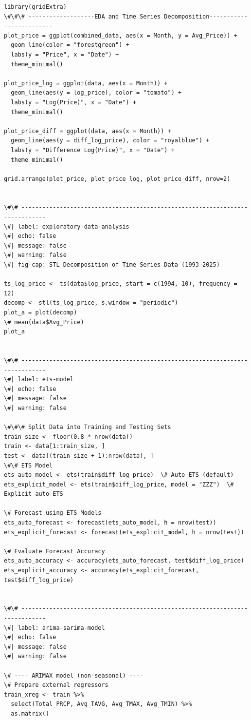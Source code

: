 \documentclass[
  letterpaper,
  DIV=11,
  numbers=noendperiod]{scrartcl}
\begin{document}
\begin{verbatim}
library(gridExtra)
\#\#\# -------------------EDA and Time Series Decomposition-------------------------
plot_price = ggplot(combined_data, aes(x = Month, y = Avg_Price)) +
  geom_line(color = "forestgreen") +
  labs(y = "Price", x = "Date") +
  theme_minimal()

plot_price_log = ggplot(data, aes(x = Month)) +
  geom_line(aes(y = log_price), color = "tomato") +
  labs(y = "Log(Price)", x = "Date") +
  theme_minimal()

plot_price_diff = ggplot(data, aes(x = Month)) +
  geom_line(aes(y = diff_log_price), color = "royalblue") +
  labs(y = "Difference Log(Price)", x = "Date") +
  theme_minimal()

grid.arrange(plot_price, plot_price_log, plot_price_diff, nrow=2)


\#\# -----------------------------------------------------------------------------
\#| label: exploratory-data-analysis
\#| echo: false
\#| message: false
\#| warning: false
\#| fig-cap: STL Decomposition of Time Series Data (1993–2025)

ts_log_price <- ts(data$log_price, start = c(1994, 10), frequency = 12)
decomp <- stl(ts_log_price, s.window = "periodic")
plot_a = plot(decomp)
\# mean(data$Avg_Price)
plot_a


\#\# -----------------------------------------------------------------------------
\#| label: ets-model
\#| echo: false
\#| message: false
\#| warning: false

\#\#\# Split Data into Training and Testing Sets
train_size <- floor(0.8 * nrow(data))
train <- data[1:train_size, ]
test <- data[(train_size + 1):nrow(data), ]
\#\# ETS Model
ets_auto_model <- ets(train$diff_log_price)  \# Auto ETS (default)
ets_explicit_model <- ets(train$diff_log_price, model = "ZZZ")  \# Explicit auto ETS

\# Forecast using ETS Models
ets_auto_forecast <- forecast(ets_auto_model, h = nrow(test))
ets_explicit_forecast <- forecast(ets_explicit_model, h = nrow(test))

\# Evaluate Forecast Accuracy
ets_auto_accuracy <- accuracy(ets_auto_forecast, test$diff_log_price)
ets_explicit_accuracy <- accuracy(ets_explicit_forecast, test$diff_log_price)


\#\# -----------------------------------------------------------------------------
\#| label: arima-sarima-model
\#| echo: false
\#| message: false
\#| warning: false

\# ---- ARIMAX model (non-seasonal) ----
\# Prepare external regressors
train_xreg <- train %>% 
  select(Total_PRCP, Avg_TAVG, Avg_TMAX, Avg_TMIN) %>% 
  as.matrix()


\end{verbatim}
\end{document}
